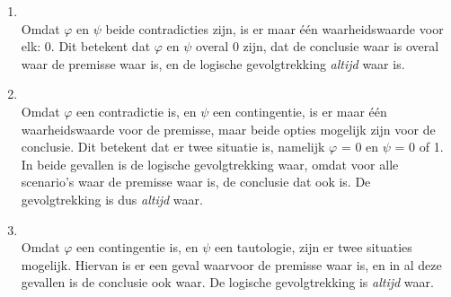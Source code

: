 \begin{answer}
\begin{enumerate}[label=\textit{\alph*.}]
\item{}\\
    Omdat $\varphi$ en $\psi$ beide contradicties zijn, is er maar \'{e}\'{e}n waarheidswaarde voor elk: 0. Dit betekent dat $\varphi$ en $\psi$ overal 0 zijn, dat de conclusie waar is overal waar de premisse waar is, en de logische gevolgtrekking \emph{altijd} waar is.

\item{}\\
    Omdat $\varphi$ een contradictie is, en $\psi$ een contingentie, is er maar \'{e}\'{e}n waarheidswaarde voor de premisse, maar beide opties mogelijk zijn voor de conclusie. Dit betekent dat er twee situatie is, namelijk $\varphi$ = 0 en $\psi$ = 0 of 1. In beide gevallen is de logische gevolgtrekking waar, omdat voor alle scenario's waar de premisse waar is, de conclusie dat ook is. De gevolgtrekking is dus \emph{altijd} waar.

\item{}\\
    Omdat $\varphi$ een contingentie is, en $\psi$ een tautologie, zijn er twee situaties mogelijk. Hiervan is er een geval waarvoor de premisse waar is, en in al deze gevallen is de conclusie ook waar. De logische gevolgtrekking is \emph{altijd} waar.


\end{enumerate}
\end{answer}

